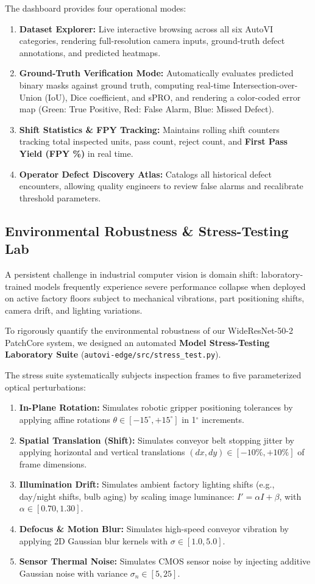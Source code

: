 \documentclass[journal,twocolumn]{IEEEtran}
\begin{document}
The dashboard provides four operational modes:
\begin{enumerate}
    \item \textbf{Dataset Explorer:} Live interactive browsing across all six AutoVI categories, rendering full-resolution camera inputs, ground-truth defect annotations, and predicted heatmaps.
    \item \textbf{Ground-Truth Verification Mode:} Automatically evaluates predicted binary masks against ground truth, computing real-time Intersection-over-Union (IoU), Dice coefficient, and sPRO, and rendering a color-coded error map (Green: True Positive, Red: False Alarm, Blue: Missed Defect).
    \item \textbf{Shift Statistics \& FPY Tracking:} Maintains rolling shift counters tracking total inspected units, pass count, reject count, and \textbf{First Pass Yield (FPY \%)} in real time.
    \item \textbf{Operator Defect Discovery Atlas:} Catalogs all historical defect encounters, allowing quality engineers to review false alarms and recalibrate threshold parameters.
\end{enumerate}

\subsection{Environmental Robustness & Stress-Testing Lab}
A persistent challenge in industrial computer vision is domain shift: laboratory-trained models frequently experience severe performance collapse when deployed on active factory floors subject to mechanical vibrations, part positioning shifts, camera drift, and lighting variations.

To rigorously quantify the environmental robustness of our WideResNet-50-2 PatchCore system, we designed an automated \textbf{Model Stress-Testing Laboratory Suite} (\texttt{autovi-edge/src/stress\_test.py}).

The stress suite systematically subjects inspection frames to five parameterized optical perturbations:
\begin{enumerate}
    \item \textbf{In-Plane Rotation:} Simulates robotic gripper positioning tolerances by applying affine rotations $\theta \in [-15^\circ, +15^\circ]$ in 1$^\circ$ increments.
    \item \textbf{Spatial Translation (Shift):} Simulates conveyor belt stopping jitter by applying horizontal and vertical translations $(dx, dy) \in [-10\%, +10\%]$ of frame dimensions.
    \item \textbf{Illumination Drift:} Simulates ambient factory lighting shifts (e.g., day/night shifts, bulb aging) by scaling image luminance: $I' = \alpha I + \beta$, with $\alpha \in [0.70, 1.30]$.
    \item \textbf{Defocus \& Motion Blur:} Simulates high-speed conveyor vibration by applying 2D Gaussian blur kernels with $\sigma \in [1.0, 5.0]$.
    \item \textbf{Sensor Thermal Noise:} Simulates CMOS sensor noise by injecting additive Gaussian noise with variance $\sigma_n \in [5, 25]$.
\end{enumerate}
\end{document}
